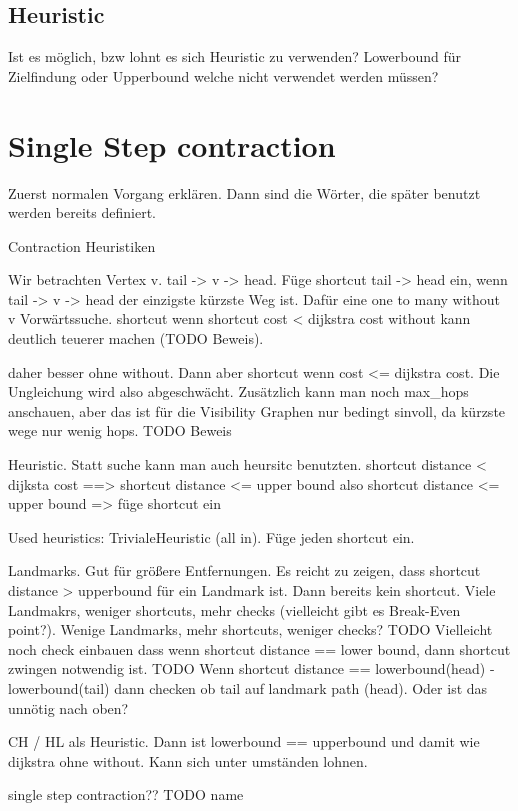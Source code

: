 \subsection{Heuristic}

Ist es möglich, bzw lohnt es sich Heuristic zu verwenden? Lowerbound für Zielfindung oder Upperbound welche nicht verwendet werden müssen?


\section{Single Step contraction}
Zuerst normalen Vorgang erklären. Dann sind die Wörter, die später benutzt werden bereits definiert.

Contraction Heuristiken

Wir betrachten Vertex v. tail -> v -> head.
Füge shortcut tail -> head ein, wenn tail -> v -> head der einzigste kürzste Weg ist.
Dafür eine one to many without v Vorwärtssuche.
shortcut wenn shortcut cost < dijkstra cost
without kann deutlich teuerer machen (TODO Beweis).

daher besser ohne without. Dann aber shortcut wenn cost <= dijkstra cost.
Die Ungleichung wird also abgeschwächt.
Zusätzlich kann man noch max\_hops anschauen, aber das ist für die Visibility Graphen nur bedingt sinvoll, da kürzste wege nur wenig hops. TODO Beweis

Heuristic.
Statt suche kann man auch heursitc benutzten.
shortcut distance < dijksta cost ==> shortcut distance <= upper bound
also shortcut distance <= upper bound => füge shortcut ein

Used heuristics:
TrivialeHeuristic (all in). Füge jeden shortcut ein.

Landmarks. Gut für größere Entfernungen.
Es reicht zu zeigen, dass shortcut distance > upperbound für ein Landmark ist. Dann bereits kein shortcut.
Viele Landmakrs, weniger shortcuts, mehr checks (vielleicht gibt es Break-Even point?). Wenige Landmarks, mehr shortcuts, weniger checks?
TODO Vielleicht noch check einbauen dass wenn shortcut distance == lower bound, dann shortcut zwingen notwendig ist.
TODO Wenn shortcut distance == lowerbound(head) - lowerbound(tail) dann checken ob tail auf landmark path (head). Oder ist das unnötig nach oben?

CH / HL als Heuristic.
Dann ist lowerbound == upperbound und damit wie dijkstra ohne without. Kann sich unter umständen lohnen.


single step contraction?? TODO name

